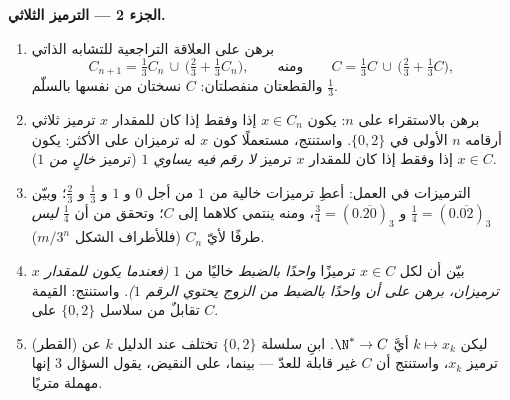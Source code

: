 \begin{problem}[{مسألة نهاية الأسبوع --- \omterm{pb:b1:topology:1}{مجموعة كانتور} ذات الأثلاث
الوسطى: طولها معدوم، وغير قابلة للعدّ، وتامّة، و $C + C =
\intcc{0}{2}$}]
\medskip
\noindent\textbf{الجزء 2 --- الترميز الثلاثي.}
\begin{enumerate}[resume]
  \item برهن على العلاقة التراجعية للتشابه الذاتي
        \[
        C_{n+1} = \tfrac13 C_n \,\cup\,
        \bigl(\tfrac23 + \tfrac13 C_n\bigr),
        \qquad\text{ومنه}\qquad
        C = \tfrac13 C \,\cup\, \bigl(\tfrac23 + \tfrac13
        C\bigr),
        \]
        والقطعتان منفصلتان:  $C$ نسختان من
        نفسها بالسلّم $\frac13$.
  \item برهن بالاستقراء على $n$: يكون $x \in C_n$ إذا وفقط إذا
        كان للمقدار $x$ ترميز ثلاثي أرقامه $n$ الأولى في
        $\{0, 2\}$. واستنتج، مستعملًا كون $x$ له ترميزان
        على الأكثر: يكون $x \in C$ إذا وفقط إذا كان للمقدار $x$ ترميز
        \emph{لا رقم فيه يساوي $1$} (ترميز \emph{خالٍ من $1$}).
  \item الترميزات في العمل: أعطِ ترميزات خالية من $1$ من أجل $0$ و $1$ و
        $\frac13$ و $\frac23$؛ وبيّن $\frac14 = (0.\overline{02})_3$
        و $\frac34 = (0.\overline{20})_3$، ومنه ينتمي كلاهما إلى
        $C$؛ وتحقق من أن $\frac14$ \emph{ليس} طرفًا
        لأيّ $C_n$ (فللأطراف الشكل $m/3^n$).
  \item بيّن أن لكل $x \in C$ ترميزًا \emph{واحدًا بالضبط} خاليًا من $1$
        \emph{(فعندما يكون للمقدار $x$ ترميزان، برهن على أن واحدًا بالضبط
        من الزوج يحتوي الرقم $1$)}. واستنتج: 
        القيمة تقابلٌ من سلاسل $\{0,2\}$ على
        $C$.
  \item (القطر) ليكن $k \mapsto x_k$ أيَّ  $\N^* \to C$.
        ابنِ سلسلة $\{0, 2\}$ تختلف عند الدليل $k$ عن
        ترميز $x_k$، واستنتج أن $C$ غير قابلة للعدّ
        --- بينما، على النقيض، يقول السؤال 3 إنها
        مهملة متريًا.
\end{enumerate}


\end{problem}
